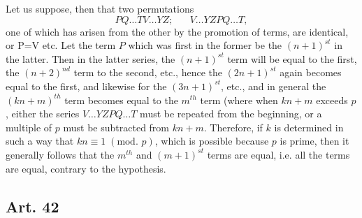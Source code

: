 \documentclass{book}
\theoremstyle{plain}
\theoremstyle{remark}
\begin{document}
Let us suppose, then that two permutations 
\[ PQ\dots TV \dots YZ; \;\;\;\;\;\; V\dots YZPQ \dots T, \]
one of which has arisen from the other by the promotion of terms, are identical, or P=V etc.   Let the term $P$ which was first in the former be the $(n+1)^{st}$ in the latter.  Then in the latter series, the $(n+1)^{st}$ term will be equal to the first, the $(n+2)^{nd}$ term to the second, etc., hence the $(2n+1)^{st}$ again becomes equal to the first, and likewise for the $(3n+1)^{st}$, etc., and in general the $(kn+m)^{th}$ term becomes equal to the $m^{th}$ term (where when $kn+m$ exceeds $p$, either the series $V\dots YZPQ \dots T$ must be repeated from the beginning, or a multiple of $p$ must be subtracted from $kn+m$.  Therefore, if $k$ is determined in such a way that $kn \equiv 1 \; (\textrm{mod. } p)$, which is possible because $p$ is prime, then it generally follows that the $m^{th}$ and $(m+1)^{st}$ terms are equal, i.e. all the terms are equal, contrary to the hypothesis.

\subsection*{Art. 42}
\end{document}
